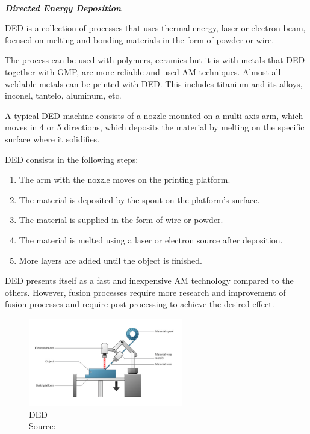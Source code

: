 \\ \textbf{\emph{Directed Energy Deposition}}\\
\par
DED is a collection of processes that uses thermal energy, laser or electron beam, focused on melting and bonding materials in the form of powder or wire\cite{shamsaei2015overview}.\par
The process can be used with polymers, ceramics but it is with metals that DED together with GMP, are more reliable and used AM techniques.
Almost all weldable metals can be printed with DED. This includes titanium and its alloys, inconel, tantelo, aluminum, etc\cite{bourell2017materials,shamsaei2015overview}.\par
A typical DED machine consists of a nozzle mounted on a multi-axis arm, which moves in 4 or 5 directions, which deposits the material by melting on the specific surface where it solidifies. \par
DED consists in the following steps\cite{DED2}:
\begin{enumerate}
    \item The arm with the nozzle moves on the printing platform.
    \item The material is deposited by the spout on the platform's surface.
    \item The material is supplied in the form of wire or powder.
    \item The material is melted using a laser or electron source after deposition.
    \item More layers are added until the object is finished.
\end{enumerate}

DED presents itself as a fast and inexpensive AM technology compared to the others. However, fusion processes require more research and improvement of fusion processes and require post-processing to achieve the desired effect\cite{DED}.

\begin{figure}[h]
\centering
\includegraphics[width=0.6\textwidth]{./Images/DED.jpg}
\caption{DED\\
Source: \cite{DED2}}
\label{DED}
\end{figure}
\\

